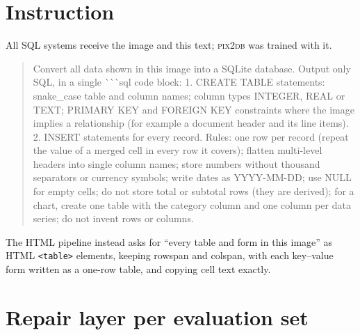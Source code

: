 \documentclass[10pt,twocolumn]{article}
\newcommand{\sys}{\textsc{pix2db}}
\begin{document}



\appendix
\onecolumn
\section{Instruction}
\label{app:prompt}
All SQL systems receive the image and this text; \sys{} was trained with it.
\begin{quote}\small\ttfamily
Convert all data shown in this image into a SQLite database. Output only SQL, in a single \`{}\`{}\`{}sql code block:
1. CREATE TABLE statements: snake\_case table and column names; column types INTEGER, REAL or TEXT; PRIMARY KEY and
FOREIGN KEY constraints where the image implies a relationship (for example a document header and its line items).
2. INSERT statements for every record. Rules: one row per record (repeat the value of a merged cell in every row it
covers); flatten multi-level headers into single column names; store numbers without thousand separators or
currency symbols; write dates as YYYY-MM-DD; use NULL for empty cells; do not store total or subtotal rows (they are
derived); for a chart, create one table with the category column and one column per data series; do not invent
rows or columns.
\end{quote}
The HTML pipeline instead asks for ``every table and form in this image'' as HTML \texttt{<table>} elements, keeping
rowspan and colspan, with each key--value form written as a one-row table, and copying cell text exactly.

\section{Repair layer per evaluation set}
\begin{table}[h]
\centering\small

\caption{Share of executable outputs and cell F1 before $\to$ after repair. For receipts the F1 column shows cell
F1, not the recall used in Table~\ref{tab:main}.}
\label{tab:repair}
\end{table}
\end{document}
